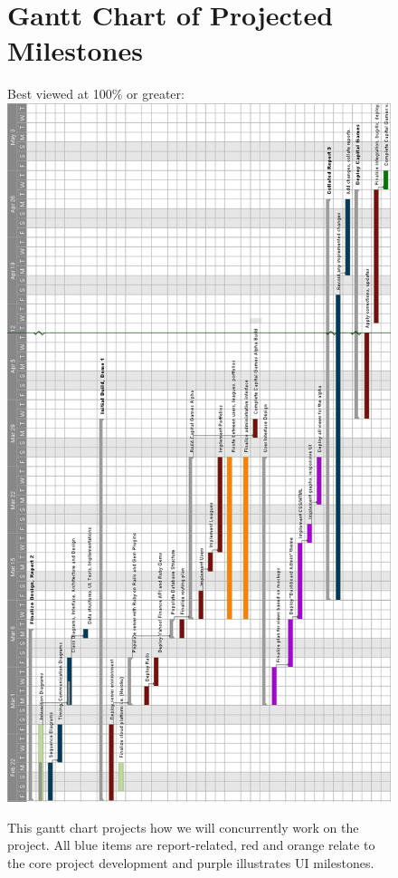 \hfil\eject \pdfpagewidth=8.5in \pdfpageheight=16in
\begin{figure}
\section{Gantt Chart of Projected Milestones} 
Best viewed at 100\% or greater:    
\centering
\includegraphics[width=6.5in]{./img/gantt.png}
\caption{This gantt chart projects how we will concurrently work on
the project. All blue items are report-related, red and orange relate
to the core project development and purple illustrates UI milestones.}
\end{figure}
